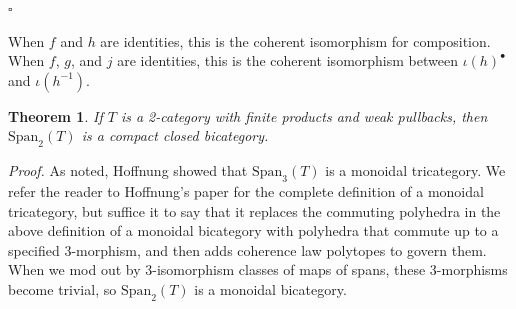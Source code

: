 \documentclass[12pt,twoside,openright]{report}
\newtheorem{thm}{Theorem}
\newcommand{\Span}{\mbox{Span}}
\begin{document}
\begin{center}
\end{center}

\hfill $\square$


When $f$ and $h$ are identities, this is the coherent isomorphism for composition.  When $f$, $g$, and $j$ are identities, this is the coherent isomorphism between $\iota(h)^\bullet$ and $\iota(h^{-1}).$  

\begin{thm}
  \label{Span2}
  If $T$ is a 2-category with finite products and weak pullbacks, then
$\Span_2(T)$ is a compact closed bicategory.
\end{thm}
{\em Proof.} As noted, Hoffnung \cite{Hoffnung} showed that $\Span_3(T)$
is a monoidal tricategory.  We refer the reader to Hoffnung's paper for the complete definition of a monoidal tricategory, but suffice it to say that it replaces the commuting polyhedra in the above definition of a monoidal bicategory with polyhedra that commute up to a specified 
3-morphism, and then adds coherence law polytopes to govern them.  When we mod out by 3-isomorphism classes of maps of spans, these 3-morphisms become trivial, so $\Span_2(T)$ is a monoidal bicategory.
\end{document}
